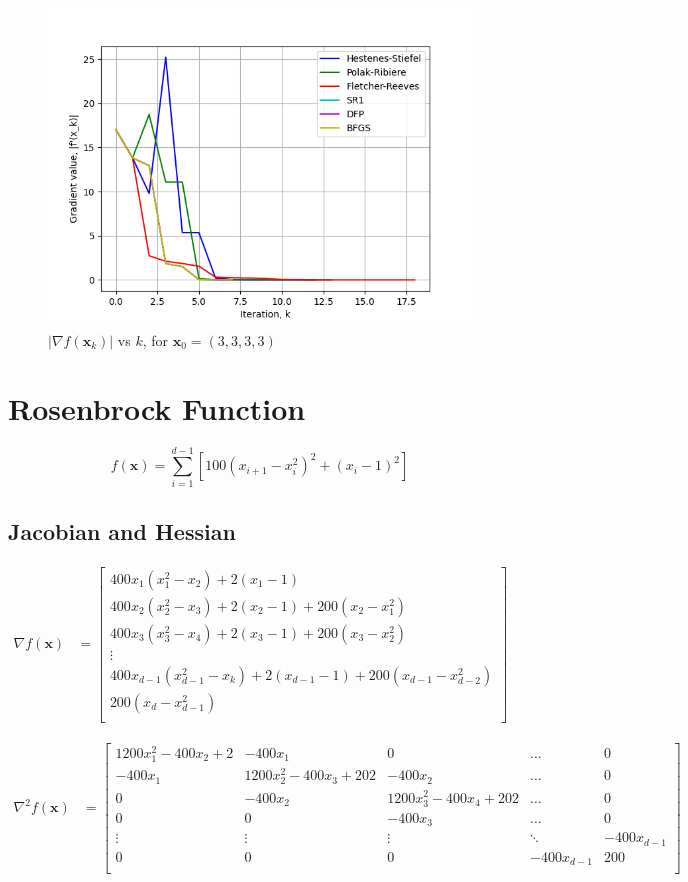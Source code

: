 \documentclass[a4paper]{article}
\begin{document}
\begin{figure}[H]
    \centering
    \includegraphics[width=.65\textwidth]{images/styblinski_tang_function_grad.png}
    \caption{$|\nabla f(\textbf{x}_k)|$ vs $k$, for $\textbf{x}_0 = (3, 3, 3, 3)$}
\end{figure}

\section{Rosenbrock Function}

$$f(\textbf{x}) = \sum_{i=1}^{d-1} [ 100(x_{i+1} - x_i^2)^2 + (x_i - 1)^2 ]$$

\subsection{Jacobian and Hessian}

\begin{align*}
\nabla f(\textbf{x}) &=
    \begin{bmatrix}
        400 x_1 (x_1^2 - x_2) + 2 (x_1 - 1) \\
        400 x_2 (x_2^2 - x_3) + 2 (x_2 - 1) + 200 (x_2 - x_1^2) \\
        400 x_3 (x_3^2 - x_4) + 2 (x_3 - 1) + 200 (x_3 - x_2^2) \\
        \vdots \\
        400 x_{d-1} (x_{d-1}^2 - x_k) + 2 (x_{d-1} - 1) + 200 (x_{d-1} - x_{d-2}^2) \\
        200 (x_d - x_{d-1}^2) \\
    \end{bmatrix}
\end{align*}

\begin{align*}
\nabla^2 f(\textbf{x}) &=
    \begin{bmatrix}
        1200 x_1^2 - 400 x_2 + 2 & -400 x_1 & 0 & \dots & 0 \\
        -400 x_1 & 1200 x_2^2 - 400 x_3 + 202 & -400 x_2 & \dots & 0 \\
        0 & -400 x_2 & 1200 x_3^2 - 400 x_4 + 202 & \dots & 0 \\
        0 & 0 & -400 x_3 & \dots & 0 \\
        \vdots & \vdots & \vdots & \ddots & -400 x_{d-1} \\
        0 & 0 & 0 & -400 x_{d-1} & 200 \\
    \end{bmatrix}
\end{align*}
\end{document}
